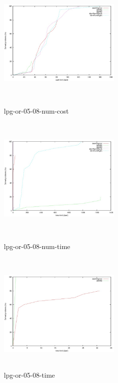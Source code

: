 \documentclass{article}
\begin{document}
\begin{figure}[!htb]
   \begin{minipage}{0.48\textwidth}
     \centering
     \includegraphics[width=6cm, height=6cm]{lpg-or-05-08-num-cost}
    \caption{lpg-or-05-08-num-cost}
   \end{minipage}\hfill
   \begin {minipage}{0.48\textwidth}
     \centering
     \includegraphics[width=6cm, height=6cm]{lpg-or-05-08-num-time}
    \caption{lpg-or-05-08-num-time}
   \end{minipage}
   
  \begin{minipage}{0.48\textwidth}
     \centering
     \includegraphics[width=6cm, height=6cm]{lpg-or-08-time}
    \caption{lpg-or-05-08-time}
   \end{minipage}\hfill
\end{figure}
\end{document}
